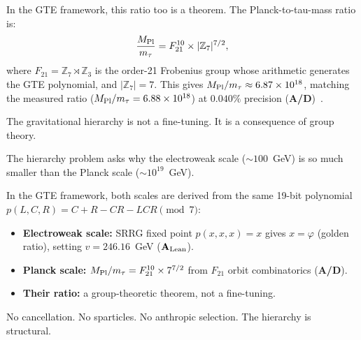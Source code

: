 \documentclass[11pt,a4paper]{article}
\newcommand{\CatAL}{\ensuremath{\mathbf{A}_{\rm Lean}}}
\newcommand{\CatAD}{\textbf{A/D}}
\begin{document}
In the GTE framework, this ratio too is a theorem.
The Planck-to-tau-mass ratio is:
\[
  \frac{M_{\rm Pl}}{m_\tau} = F_{21}^{10} \times |\mathbb{Z}_7|^{7/2},
\]
where $F_{21} = \mathbb{Z}_7 \rtimes \mathbb{Z}_3$ is the order-21
Frobenius group whose arithmetic generates the GTE polynomial,
and $|\mathbb{Z}_7| = 7$.
This gives $M_{\rm Pl}/m_\tau \approx 6.87 \times 10^{18}$, matching
the measured ratio ($M_{\rm Pl}/m_\tau = 6.88 \times 10^{18}$) at
$0.040\%$ precision (\CatAD)~\cite{SpivackGTECompleteFramework}.

The gravitational hierarchy is not a fine-tuning.
It is a consequence of group theory.

\begin{tcolorbox}[colback=boxgold,colframe=orange!50!black,
  title={The hierarchy problem, dissolved}]
The hierarchy problem asks why the electroweak scale ($\sim 100$~GeV) is
so much smaller than the Planck scale ($\sim 10^{19}$~GeV).

In the GTE framework, both scales are derived from the same 19-bit
polynomial $p(L,C,R) = C + R - CR - LCR \pmod{7}$:
\begin{itemize}[itemsep=2pt]
  \item \textbf{Electroweak scale:} SRRG fixed point $p(x,x,x) = x$
        gives $x = \varphi$ (golden ratio), setting $v = 246.16$~GeV
        (\CatAL).
  \item \textbf{Planck scale:} $M_{\rm Pl}/m_\tau = F_{21}^{10}
        \times 7^{7/2}$ from $F_{21}$ orbit combinatorics (\CatAD).
  \item \textbf{Their ratio:} a group-theoretic theorem, not a
        fine-tuning.
\end{itemize}
No cancellation. No sparticles. No anthropic selection.
The hierarchy is structural.
\end{tcolorbox}

\end{document}

